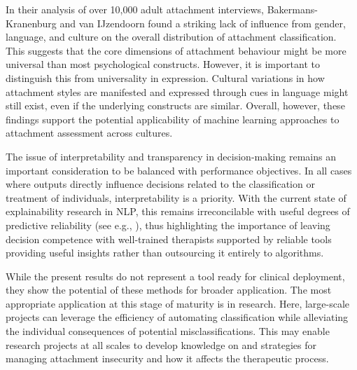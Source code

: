 \documentclass[12pt]{report}
\begin{document}
In their analysis of over 10,000 adult attachment interviews, Bakermans-Kranenburg and van IJzendoorn \citeyear{Bakermanskranenburg2009} found a striking lack of influence from gender, language, and culture on the overall distribution of attachment classification.
This suggests that the core dimensions of attachment behaviour might be more universal than most psychological constructs.
However, it is important to distinguish this from universality in expression.
Cultural variations in how attachment styles are manifested and expressed through cues in language might still exist, even if the underlying constructs are similar.
Overall, however, these findings support the potential applicability of machine learning approaches to attachment assessment across cultures.

The issue of interpretability and transparency in decision-making remains an important consideration to be balanced with performance objectives.
In all cases where outputs directly influence decisions related to the classification or treatment of individuals, interpretability is a priority.
With the current state of explainability research in NLP, this remains irreconcilable with useful degrees of predictive reliability (see e.g., ), thus highlighting the importance of leaving decision competence with well-trained therapists supported by reliable tools providing useful insights rather than outsourcing it entirely to algorithms.

While the present results do not represent a tool ready for clinical deployment, they show the potential of these methods for broader application.
The most appropriate application at this stage of maturity is in research.
Here, large-scale projects can leverage the efficiency of automating classification while alleviating the individual consequences of potential misclassifications.
This may enable research projects at all scales to develop knowledge on and strategies for managing attachment insecurity and how it affects the therapeutic process.
\end{document}
